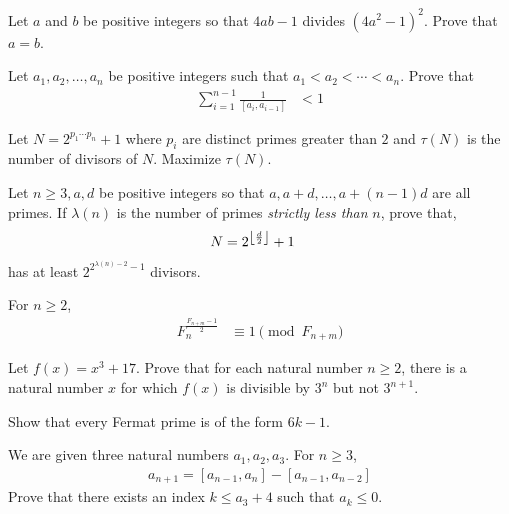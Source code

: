 \begin{problem}
	Let $a$ and $b$ be positive integers so that $4ab-1$ divides $(4a^2-1)^2$. Prove that $a=b$.
\end{problem}

\begin{problem}\label{prob:mirzakhani9}
	Let $a_1,a_2,\ldots,a_n$ be positive integers such that $a_1<a_2<\cdots < a_n$. Prove that
	\begin{align*}
		\sum_{i=1}^{n-1} \frac{1}{[a_i,a_{i-1}]} & <1
	\end{align*}
\end{problem}

\begin{problem}
	Let $N=2^{p_1\cdots p_n}+1$ where $p_i$ are distinct primes greater than $2$ and $\tau(N)$ is the number of divisors of $N$. Maximize $\tau(N)$.
\end{problem}

\begin{problem}
	Let $n\geq3,a,d$ be positive integers so that $a,a+d,\ldots,a+(n-1)d$ are all primes. If $\lambda(n)$ is the number of primes \textit{strictly less than }$n$, prove that,
		\begin{align*}
			N & = 2^{\left\lfloor{\frac{d}{2}}\right\rfloor}+1
		\end{align*}
	has at least $2^{2^{\lambda(n)-2}-1}$ divisors.
\end{problem}

\begin{problem}
	For $n\geq2$,
	\begin{align*}
		F_n^{\frac{F_{n+m}-1}{2}} &\equiv1\pmod{F_{n+m}}
	\end{align*}
\end{problem}

\begin{problem}
	Let $f(x) = x^3 + 17$. Prove that for each natural number $n\geq 2$, there is a natural number $x$ for which $f(x)$ is divisible by $3^n$ but not $3^{n+1}$.
\end{problem}

\begin{problem}[Boylai]
	Show that every Fermat prime is of the form $6k-1$.
\end{problem}

\begin{problem}
	We are given three natural numbers $a_1,a_2,a_3$. For $n\geq3$,
		\begin{align*}
			a_{n+1} = [a_{n-1},a_n]-[a_{n-1},a_{n-2}]
		\end{align*}
	Prove that there exists an index $k\leq a_3+4$ such that $a_k\leq0$.
\end{problem}


